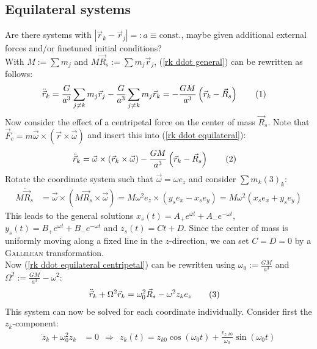 \documentclass[a4paper,12pt]{article}
\newcommand\numberthis{\addtocounter{equation}{1}\tag{\theequation}}
\newcommand{\kla}{}
\newcommand{\tecxt}{}
\begin{document}
\subsection{Equilateral systems}
Are there systems with $|\vec{r}_k-\vec{r}_j|=:a\equiv\tecxt\text{const.} $, maybe given additional external forces and/or finetuned initial conditions?\\
With $M:=\sum m_j$ and $M\vec{R}_s:=\sum m_j\vec{r}_j$, (\ref{rk ddot general}) can be rewritten as follows:
\begin{align*}
\ddot{\vec{r}}_k&=\frac{G}{a^3}\sum_{j\neq k}m_j\vec{r}_j-\frac{G}{a^3}\sum_{j\neq k}m_j\vec{r}_k=-\frac{GM}{a^3}\kla\left( {\vec{r}_k-\vec{R}_s} \right)\numberthis\label{rk ddot equilateral}
\end{align*}
Now consider the effect of a centripetal force on the center of mass $\vec{R}_s$. Note that $\vec{F}_c=m\vec{\omega}\times(\vec{r}\times\vec{\omega})$ and insert this into (\ref{rk ddot equilateral}):
\begin{align*}
\ddot{\vec{r}}_k&=\vec{\omega}\times(\vec{r}_k\times\vec{\omega})-\frac{GM}{a^3}\kla\left( {\vec{r}_k-\vec{R}_s} \right)\numberthis\label{rk ddot equilateral centripetal}
\end{align*}
Rotate the coordinate system such that $\vec{\omega}=\omega e_z$ and consider $\sum m_k(3)_k$:
\begin{align*}
M\ddot{\vec{R}}_s&=\vec{\omega}\times(M\vec{R}_s\times\vec{\omega})=M\omega^2e_z\times (y_se_x-x_se_y)=M\omega^2(x_se_x+y_se_y)
\end{align*}
This leads to the general solutions $x_s(t)=A_+e^{\omega t}+A_-e^{-\omega t}$, $y_s(t)=B_+e^{\omega t}+B_-e^{-\omega t}$ and $z_s(t)=Ct+D$. Since the center of mass is uniformly moving along a fixed line in the $z$-direction, we can set $C=D=0$ by a \textsc{Gallilean} transformation. \\
Now (\ref{rk ddot equilateral centripetal}) can be rewritten using $\omega_0:=\frac{GM}{a^3}$ and $\Omega^2:=\frac{GM}{a^3}-\omega^2$:
\begin{align*}
\ddot{\vec{r}}_k+\Omega^2\vec{r}_k&=\omega_0^2\vec{R}_s-\omega^2z_ke_z\numberthis\label{rk ddot inhomogenious system}
\end{align*}
This system can now be solved for each coordinate individually. Consider first the $z_k$-component:
\begin{align*}
\ddot{z}_k+\omega_0^2z_k&=0\ \ \Rightarrow\ \ z_k(t)=z_{k0}\cos(\omega_0t)+\frac{v_{z,k0}}{\omega_0}\sin(\omega_0t)
\end{align*}
\end{document}
